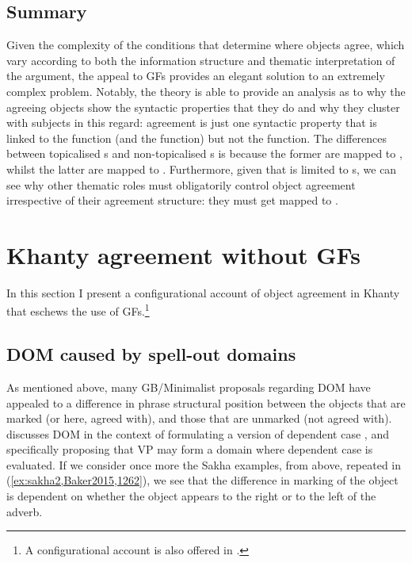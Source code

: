 \documentclass[output=paper
,modfonts
,nonflat]{langsci/langscibook}
\begin{document}
\subsection{Summary}

Given the complexity of the conditions that determine where objects agree, which vary according to both the information structure and thematic interpretation of the argument, the appeal to GFs provides an elegant solution to an extremely complex problem.  
Notably, the theory is able to provide an analysis as to why the agreeing objects show the syntactic properties that they do and why they cluster with subjects in this regard: agreement is just one syntactic property that is linked to the \object{} function (and the \subj{} function) but not the \robj{} function.
The differences between topicalised \theme s and non-topicalised \theme s is because the former are mapped to \object, whilst the latter are mapped to \robj.
Furthermore, given that \robj{} is limited to \theme s, we can see why other thematic roles must obligatorily control object agreement irrespective of their agreement structure: they must get mapped to \object.

\section{Khanty agreement without GFs}\label{reanalysis}

In this section I present a configurational account of object agreement in Khanty that eschews the use of GFs.\footnote{A configurational account is also offered in \citet{barany2016b}.}

\subsection{DOM caused by spell-out domains}

As mentioned above, many GB/Minimalist proposals regarding DOM have appealed to a difference in phrase structural position between the objects that are marked (or here, agreed with), and those that are unmarked (not agreed with).
\citet{Baker2015} discusses DOM in the context of formulating a version of dependent case \citep{Marantz1991}, and specifically proposing that VP may form a domain where dependent case is evaluated. 
If we consider once more the Sakha examples, from above, repeated in (\ref{ex:sakha2,Baker2015,1262}), we see that the difference in marking of the object is dependent on whether the object appears to the right or to the left of the adverb.
\end{document}
